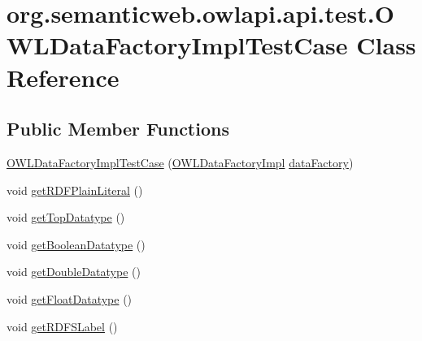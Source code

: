 \hypertarget{classorg_1_1semanticweb_1_1owlapi_1_1api_1_1test_1_1_o_w_l_data_factory_impl_test_case}{\section{org.\-semanticweb.\-owlapi.\-api.\-test.\-O\-W\-L\-Data\-Factory\-Impl\-Test\-Case Class Reference}
\label{classorg_1_1semanticweb_1_1owlapi_1_1api_1_1test_1_1_o_w_l_data_factory_impl_test_case}
}
\subsection*{Public Member Functions}
\begin{DoxyCompactItemize}
\item 
\hyperlink{classorg_1_1semanticweb_1_1owlapi_1_1api_1_1test_1_1_o_w_l_data_factory_impl_test_case_a8078343e819b73dd7751fc2aae0244b5}{O\-W\-L\-Data\-Factory\-Impl\-Test\-Case} (\hyperlink{classuk_1_1ac_1_1manchester_1_1cs_1_1owl_1_1owlapi_1_1_o_w_l_data_factory_impl}{O\-W\-L\-Data\-Factory\-Impl} \hyperlink{classorg_1_1semanticweb_1_1owlapi_1_1api_1_1test_1_1_o_w_l_data_factory_impl_test_case_a8b5ffc5ba7c8e73e8628919047210c13}{data\-Factory})
\item 
void \hyperlink{classorg_1_1semanticweb_1_1owlapi_1_1api_1_1test_1_1_o_w_l_data_factory_impl_test_case_a4c78b2c4e158fed161a00984bcbd40ab}{get\-R\-D\-F\-Plain\-Literal} ()
\item 
void \hyperlink{classorg_1_1semanticweb_1_1owlapi_1_1api_1_1test_1_1_o_w_l_data_factory_impl_test_case_a0666e76ac88baadd8733591eea55b9cd}{get\-Top\-Datatype} ()
\item 
void \hyperlink{classorg_1_1semanticweb_1_1owlapi_1_1api_1_1test_1_1_o_w_l_data_factory_impl_test_case_a2c44dc781239545c6007b213a0ca3b8f}{get\-Boolean\-Datatype} ()
\item 
void \hyperlink{classorg_1_1semanticweb_1_1owlapi_1_1api_1_1test_1_1_o_w_l_data_factory_impl_test_case_a2eb0370d4d727a5e7053c64be539d70c}{get\-Double\-Datatype} ()
\item 
void \hyperlink{classorg_1_1semanticweb_1_1owlapi_1_1api_1_1test_1_1_o_w_l_data_factory_impl_test_case_a32d3b5497e2e8b51eebbe7ac3de54151}{get\-Float\-Datatype} ()
\item 
void \hyperlink{classorg_1_1semanticweb_1_1owlapi_1_1api_1_1test_1_1_o_w_l_data_factory_impl_test_case_acc4b84d83c6c0536ac3105ad994d5a49}{get\-R\-D\-F\-S\-Label} ()

\end{DoxyCompactItemize}
